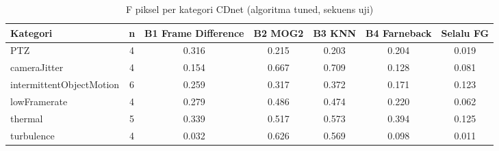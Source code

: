 \begin{table}[t]
\centering
\caption{F piksel per kategori CDnet (algoritma tuned, sekuens uji)}
\label{tab:table_by_category}
\begin{tabular}{lcccccc}
\toprule
Kategori & n & B1 Frame Difference & B2 MOG2 & B3 KNN & B4 Farneback & Selalu FG \\
\midrule
PTZ & 4 & 0.316 & 0.215 & 0.203 & 0.204 & 0.019 \\
cameraJitter & 4 & 0.154 & 0.667 & 0.709 & 0.128 & 0.081 \\
intermittentObjectMotion & 6 & 0.259 & 0.317 & 0.372 & 0.171 & 0.123 \\
lowFramerate & 4 & 0.279 & 0.486 & 0.474 & 0.220 & 0.062 \\
thermal & 5 & 0.339 & 0.517 & 0.573 & 0.394 & 0.125 \\
turbulence & 4 & 0.032 & 0.626 & 0.569 & 0.098 & 0.011 \\
\bottomrule
\end{tabular}
\end{table}
